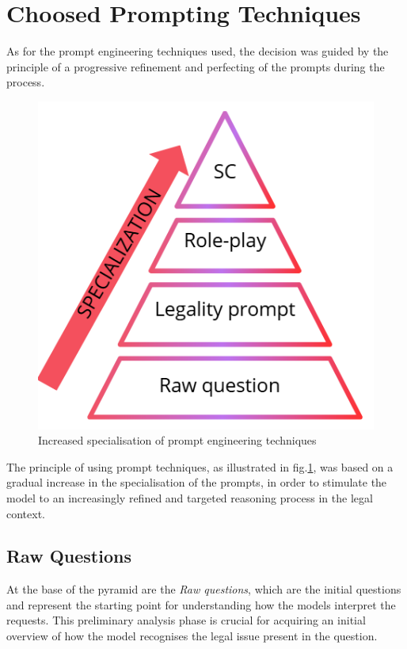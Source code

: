 \section{Choosed Prompting Techniques}
As for the prompt engineering techniques used, the decision was guided by the principle of a progressive refinement and perfecting of the prompts during the process.
\begin{figure}[H]
    \centering
    \includegraphics[width=0.7\linewidth]{Figures/piramide.png}
    \caption{Increased specialisation of prompt engineering techniques}
    \label{fig:pyramide}
\end{figure}
The principle of using prompt techniques, as illustrated in fig.\ref{fig:pyramide}, was based on a gradual increase in the specialisation of the prompts, in order to stimulate the model to an increasingly refined and targeted reasoning process in the legal context. 
\subsection{Raw Questions}
At the base of the pyramid are the \textit{Raw questions}, which are the initial questions and represent the starting point for understanding how the models interpret the requests. This preliminary analysis phase is crucial for acquiring an initial overview of how the model recognises the legal issue present in the question.
